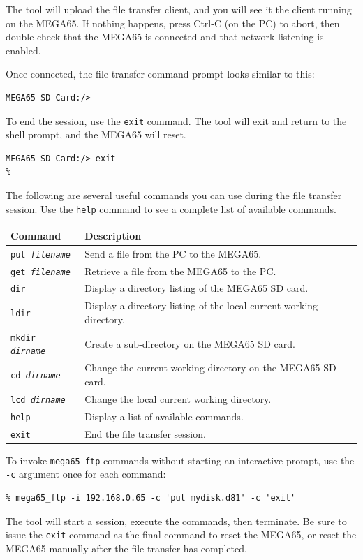 The tool will upload the file transfer client, and you will see it the client running on the MEGA65. If nothing happens, press Ctrl-C (on the PC) to abort, then double-check that the MEGA65 is connected and that network listening is enabled.

Once connected, the file transfer command prompt looks similar to this:

\begin{verbatim}
MEGA65 SD-Card:/>
\end{verbatim}

To end the session, use the {\tt exit} command. The tool will exit and return to the shell prompt, and the MEGA65 will reset.

\begin{verbatim}
MEGA65 SD-Card:/> exit
%
\end{verbatim}

The following are several useful commands you can use during the file transfer session. Use the {\tt help} command to see a complete list of available commands.

\begin{center}
\begin{tabular}{|l|l|}
\hline
{\bf Command} & {\bf Description} \\
\hline
{\tt put {\it filename}} & Send a file from the PC to the MEGA65. \\
\hline
{\tt get {\it filename}} & Retrieve a file from the MEGA65 to the PC. \\
\hline
{\tt dir} & Display a directory listing of the MEGA65 SD card. \\
\hline
{\tt ldir} & Display a directory listing of the local current working directory. \\
\hline
{\tt mkdir {\it dirname}} & Create a sub-directory on the MEGA65 SD card. \\
\hline
{\tt cd {\it dirname}} & Change the current working directory on the MEGA65 SD card. \\
\hline
{\tt lcd {\it dirname}} & Change the local current working directory. \\
\hline
{\tt help} & Display a list of available commands. \\
\hline
{\tt exit} & End the file transfer session. \\
\hline
\end{tabular}
\end{center}

To invoke {\tt mega65\_ftp} commands without starting an interactive prompt, use the {\tt -c} argument once for each command:

\begin{verbatim}
% mega65_ftp -i 192.168.0.65 -c 'put mydisk.d81' -c 'exit'
\end{verbatim}

The tool will start a session, execute the commands, then terminate. Be sure to issue the {\tt exit} command as the final command to reset the MEGA65, or reset the MEGA65 manually after the file transfer has completed.